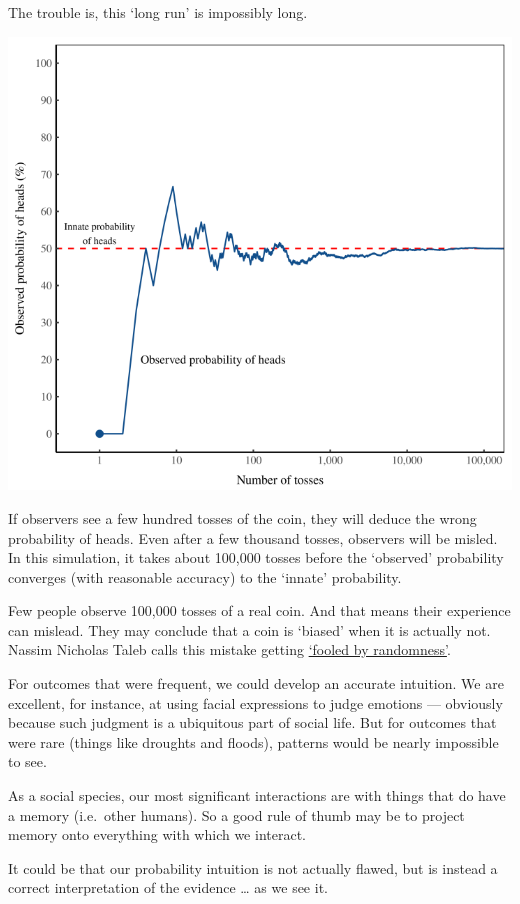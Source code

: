 \documentclass[
]{book}
\begin{document}
The trouble is, this `long run' is impossibly long.

\includegraphics{fig/innate_probability.png}

If observers see a few hundred tosses of the coin, they will deduce the wrong probability of heads.
Even after a few thousand tosses, observers will be misled. In this simulation, it takes about 100,000 tosses before the `observed' probability converges (with reasonable accuracy) to the `innate' probability.

Few people observe 100,000 tosses of a real coin. And that means their experience can mislead. They may conclude that a coin is `biased' when it is actually not. Nassim Nicholas Taleb calls this mistake getting \href{https://en.wikipedia.org/wiki/Fooled_by_Randomness}{`fooled by randomness'}.

For outcomes that were frequent, we could develop an accurate intuition. We are excellent, for instance, at using facial expressions to judge emotions --- obviously because such judgment is a ubiquitous part of social life. But for outcomes that were rare (things like droughts and floods), patterns would be nearly impossible to see.

As a social species, our most significant interactions are with things that do have a memory (i.e.~other humans). So a good rule of thumb may be to project memory onto everything with which we interact.

It could be that our probability intuition is not actually flawed, but is instead a correct interpretation of the evidence \ldots{} as we see it.
\end{document}
